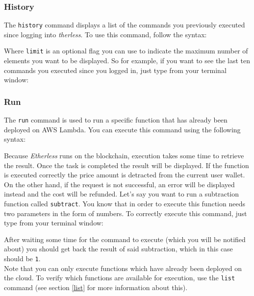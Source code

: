 \subsubsection{History}
The \texttt{history} command displays a list of the commands you previously executed since logging into \textit{therless}. To use this command, follow the syntax:
\begin{center}
\end{center}
Where \texttt{limit} is an optional flag you can use to indicate the maximum number of elements you want to be displayed.
So for example, if you want to see the last ten commands you executed since you logged in, just type from your terminal window:
\begin{center}
\end{center}

\subsubsection{Run}
The \texttt{run} command is used to run a specific function that has already been deployed on AWS Lambda. You can execute this command using the following syntax: \\
\begin{center}
\end{center}
Because \textit{Etherless} runs on the blockchain, execution takes some time to retrieve the result. Once the task is completed the result will be displayed. If the function is executed correctly the price amount is detracted from the current user wallet. On the other hand, if the request is not successful, an error will be displayed instead and the cost will be refunded.
Let's say you want to run a subtraction function called \texttt{subtract}. You know that in order to execute this function needs two parameters in the form of numbers. To correctly execute this command, just type from your terminal window:
\begin{center}
\end{center}
After waiting some time for the command to execute (which you will be notified about) you should get back the result of said subtraction, which in this case should be \texttt{1}. \\
Note that you can only execute functions which have already been deployed on the cloud. To verify which functions are available for execution, use the \texttt{list} command (see section \ref{list} for more information about this).

